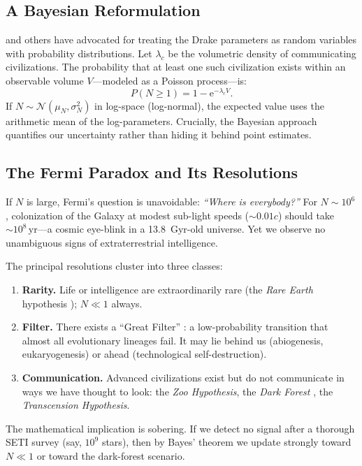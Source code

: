 \documentclass[12pt,a4paper]{article}
\newcommand{\ee}{\mathrm{e}}
\begin{document}
\subsection{A Bayesian Reformulation}

\citet{Grinspoon2003} and others have advocated for treating the Drake parameters
as random variables with probability distributions. Let $\lambda_c$ be the
volumetric density of communicating civilizations. The probability that at
least one such civilization exists within an observable volume $V$---modeled
as a Poisson process---is:
\begin{equation}
  P(N \geq 1) = 1 - \ee^{-\lambda_c V}.
  \label{eq:poisson}
\end{equation}
If $N \sim \mathcal{N}(\mu_N, \sigma_N^2)$ in log-space (log-normal), the
expected value uses the arithmetic mean of the log-parameters. Crucially, the
Bayesian approach quantifies our uncertainty rather than hiding it behind
point estimates.

\subsection{The Fermi Paradox and Its Resolutions}

If $N$ is large, Fermi's question \citep{Hart1975} is unavoidable: \textit{``Where
is everybody?''} For $N \sim 10^6$, colonization of the Galaxy at modest
sub-light speeds ($\sim 0.01c$) should take $\sim 10^8$\,yr---a cosmic eye-blink
in a \SI{13.8}{Gyr}-old universe. Yet we observe no unambiguous signs of
extraterrestrial intelligence.

The principal resolutions cluster into three classes:
\begin{enumerate}[noitemsep]
  \item \textbf{Rarity.} Life or intelligence are extraordinarily rare (the
    \emph{Rare Earth} hypothesis \citep{WardBrownlee2000}); $N \ll 1$ always.
  \item \textbf{Filter.} There exists a ``Great Filter'' \citep{Hanson1998}:
    a low-probability transition that almost all evolutionary lineages fail.
    It may lie behind us (abiogenesis, eukaryogenesis) or ahead (technological
    self-destruction).
  \item \textbf{Communication.} Advanced civilizations exist but do not
    communicate in ways we have thought to look: the \emph{Zoo Hypothesis},
    the \emph{Dark Forest} \citep{Liu2008}, the \emph{Transcension Hypothesis}.
\end{enumerate}
The mathematical implication is sobering. If we detect no signal after a
thorough SETI survey (say, $10^9$ stars), then by Bayes' theorem we update
strongly toward $N \ll 1$ or toward the dark-forest scenario.
\end{document}

